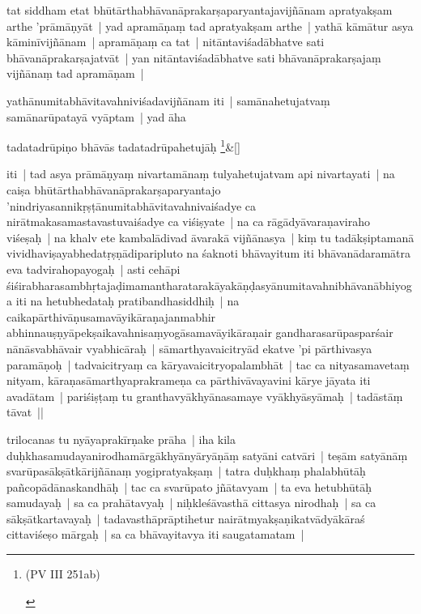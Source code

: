 \documentclass[article,a4paper]{memoir}
\newcommand{\name}[1]{#1}
\newcommand{\persName}[1]{#1}
\begin{document}
	  \pstart tat siddham etat bhū\-tā\-rthabhā\-vanā\-prakarṣaparyantajavijñā\-nam apratyakṣam arthe 'prā\-mā\-ṇyā\-t | yad apramā\-ṇaṃ tad apratyakṣam arthe | yathā\- kā\-mā\-tur asya kā\-minī\-vijñā\-nam | apramā\-ṇaṃ ca tat | nitā\-ntaviśadā\-bhatve sati bhā\-vanā\-prakarṣajatvā\-t | yan nitā\-ntaviśadā\-bhatve sati bhā\-vanā\-prakarṣajaṃ vijñā\-naṃ tad apramā\-ṇam | 
	\pend
      

	  \pstart yathā\-numitabhā\-vitavahniviśadavijñā\-nam iti | samā\-nahetujatvaṃ samā\-narū\-patayā\- vyā\-ptam | yad ā\-ha 
	\pend
      
	    
	    \stanza[\smallbreak]
tadatadrū\-piṇo bhā\-vā\-s tadatadrū\-pahetujā\-ḥ \footnote{\begin{english}(PV III 251ab)\end{english}}\&[\smallbreak]


	

	  \pstart iti | tad asya prā\-mā\-ṇyaṃ nivartamā\-naṃ tulyahetujatvam api nivartayati | na caiṣa bhū\-tā\-rthabhā\-vanā\-prakarṣaparyantajo 'nindriyasannikṛṣṭā\-numitabhā\-vitavahnivaiśadye ca nirā\-tmakasamastavastuvaiśadye ca viśiṣyate | na ca rā\-gā\-dyā\-varaṇaviraho viśeṣaḥ | na khalv ete kambalā\-divad ā\-varakā\- vijñā\-nasya | kiṃ tu tadā\-kṣiptamanā\- vividhaviṣayabhedatṛṣṇā\-diparipluto na śaknoti bhā\-vayitum iti bhā\-vanā\-daramā\-tra eva tadvirahopayogaḥ | asti cehā\-pi śiśirabharasambhṛtajaḍimamantharatarakā\-yakā\-ṇḍasyā\-numitavahnibhā\-vanā\-bhiyoga iti na hetubhedataḥ pratibandhasiddhiḥ | na caikapā\-rthivā\-ṇusamavā\-yikā\-raṇajanmabhir abhinnauṣṇyā\-pekṣaikavahnisaṃyogā\-samavā\-yikā\-raṇair gandharasarū\-pasparśair nā\-nā\-svabhā\-vair vyabhicā\-raḥ | sā\-marthyavaicitryā\-d ekatve 'pi pā\-rthivasya paramā\-ṇoḥ | tadvaicitryaṃ ca kā\-ryavaicitryopalambhā\-t | tac ca nityasamavetaṃ nityam, kā\-raṇasā\-marthyaprakrameṇa ca pā\-rthivā\-vayavini kā\-rye jā\-yata iti avadā\-tam | pariśiṣṭaṃ tu granthavyā\-khyā\-nasamaye vyā\-khyā\-syā\-maḥ | tadā\-stā\-ṃ tā\-vat || 
	\pend
      

	  \pstart \persName{trilocanas} tu \name{nyā\-yaprakī\-rṇake} prā\-ha | iha kila duḥkhasamudayanirodhamā\-rgā\-khyā\-nyā\-ryā\-ṇā\-ṃ satyā\-ni catvā\-ri | teṣā\-m satyā\-nā\-ṃ svarū\-pasā\-kṣā\-tkā\-rijñā\-naṃ yogipratyakṣaṃ | tatra duḥkhaṃ phalabhū\-tā\-ḥ pañcopā\-dā\-naskandhā\-ḥ | tac ca svarū\-pato jñā\-tavyam | ta eva hetubhū\-tā\-ḥ samudayaḥ | sa ca prahā\-tavyaḥ | niḥkleśā\-vasthā\- cittasya nirodhaḥ | sa ca sā\-kṣā\-tkartavayaḥ | tadavasthā\-prā\-ptihetur nairā\-tmyakṣaṇikatvā\-dyā\-kā\-raś cittaviśeṣo mā\-rgaḥ | sa ca bhā\-vayitavya iti saugatamatam |
	\pend
      
\end{document}
